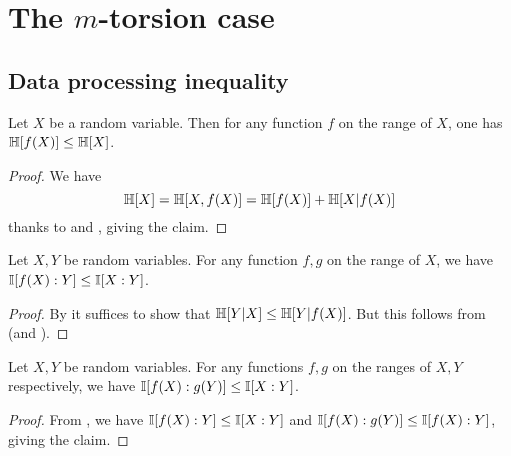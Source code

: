 \chapter{The \texorpdfstring{$m$}{m}-torsion case}

\section{Data processing inequality}

\begin{lemma}\label{data-process-single}\leanok  Let $X$ be a random variable.  Then for any function $f$ on the range of $X$, one has $\mathbb{H}[f(X)] \leq \mathbb{H}[X]$.
\end{lemma}

\begin{proof}\leanok
We have
$$ \mathbb{H}[X] = \mathbb{H}[X,f(X)] = \mathbb{H}[f(X)] + \mathbb{H}[X|f(X)]$$
thanks to  and , giving the claim.
\end{proof}

\begin{lemma}\label{data-process-unc-one}\leanok Let $X,Y$ be random variables. For any function $f, g$ on the range of $X$, we have $\mathbb{I}[f(X) : Y] \leq \mathbb{I}[X:Y]$.
\end{lemma}

\begin{proof}\leanok
  By  it suffices to show that $\mathbb{H}[Y|X] \leq \mathbb{H}[Y|f(X)]$. But this follows from  (and ).
\end{proof}

\begin{lemma}\label{data-process-unc}\leanok Let $X,Y$ be random variables. For any functions $f, g$ on the ranges of $X, Y$ respectively, we have $\mathbb{I}[f(X) : g(Y )] \leq \mathbb{I}[X : Y]$.
\end{lemma}

\begin{proof}\leanok
   From ,  we have $\mathbb{I}[f(X) : Y] \leq \mathbb{I}[X:Y]$ and $\mathbb{I}[f(X): g(Y)] \leq \mathbb{I}[f(X):Y]$, giving the claim.
\end{proof}

